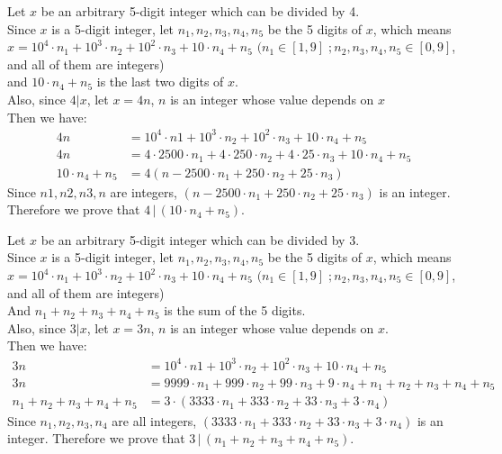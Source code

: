 \documentclass[12pt]{exam}
\newcommand{\divides}{\,|\,}
\begin{document}
\begin{solution}

\begin{qparts}
\item 
Let $x$ be an arbitrary 5-digit integer which can be divided by 4. \\
Since $x$ is a 5-digit integer, let $n_1,n_2,n_3,n_4,n_5$ be the  5 digits of $x$,  which means $x = 10^4 \cdot n_1 + 10 ^3 \cdot n_2 + 10^2 \cdot n_3 + 10 \cdot n_4 + n_5$ $ (n_1 \in [1,9]\; ; n_2, n_3,n_4,n_5\in [0,9]$, and all of them are integers) \\
and $10 \cdot n_4 + n_5$ is the last two digits of $x$.\\
Also, since $4 | x$, let $x = 4n$, $n$ is an integer whose value depends on $x$\\
Then we have: 
\begin{align*}
4n & = 10^4 \cdot n1 + 10 ^3 \cdot n_2 + 10^2 \cdot n_3 + 10 \cdot n_4 + n_5  \\
4n  & = 4 \cdot  2500 \cdot n_1 + 4 \cdot 250 \cdot n_2 + 4 \cdot 25 \cdot n_3 + 10 \cdot n_4 + n_5 \\
10 \cdot n_4 + n_5  &= 4 (n -  2500 \cdot n_1 + 250 \cdot n_2 + 25 \cdot n_3)
\end{align*}
Since $n1,n2,n3,n$ are integers, $(n -  2500 \cdot n_1 + 250 \cdot n_2 + 25 \cdot n_3)$ is an integer.
Therefore we prove that $4 \divides (10 \cdot n_4 + n_5)$.
  
\item 
Let $x$ be an arbitrary 5-digit integer which can be divided by 3.\\
Since $x$ is a 5-digit integer, let $n_1,n_2,n_3,n_4,n_5$ be the  5 digits of $x$,  which means $x = 10^4 \cdot n_1 + 10 ^3 \cdot n_2 + 10^2 \cdot n_3 + 10 \cdot n_4 + n_5$ $ (n_1 \in [1,9]\; ; n_2, n_3,n_4,n_5\in [0,9]$, and all of them are integers) \\
And $n_1 + n_2 + n_3 + n_4 + n_5$ is the sum of the 5 digits.\\
Also, since $3 |x$, let $x = 3n$, $n$ is an integer whose value depends on $x$. \\
Then we have:
\begin{align*}
3n & = 10^4 \cdot n1 + 10 ^3 \cdot n_2 + 10^2 \cdot n_3 + 10 \cdot n_4 + n_5  \\
3n  & = 9999 \cdot n_1 + 999 \cdot n_2 + 99 \cdot n_3 + 9 \cdot n_4 + n_1 + n_2 + n_3 + n_4 + n_5 \\
n_1 + n_2 + n_3 + n_4 + n_5 &= 
3 \cdot (3333 \cdot n_1 + 333 \cdot n_2 + 33 \cdot n_3 + 3\cdot n_4)
\end{align*}
Since $n_1,n_2,n_3,n_4$ are all integers, $(3333 \cdot n_1 + 333 \cdot n_2 + 33 \cdot n_3 + 3\cdot n_4)$ is an integer.
Therefore we prove that $3 \divides (n_1 + n_2 + n_3 + n_4 + n_5 )$.


\end{qparts}

\end{solution}
\end{document}
